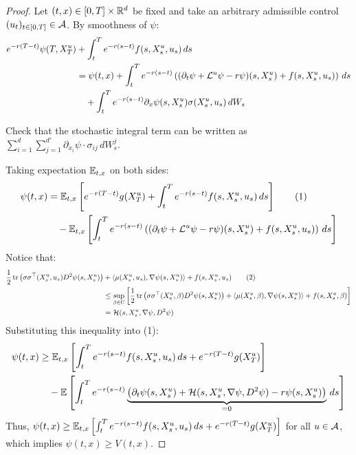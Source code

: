 \begin{remark}
    \begin{proof}
        Let $(t,x) \in [0,T] \times \mathbb R^d$ be fixed and take an arbitrary admissible control $(u_t)_{t \in [0,T]} \in \mathcal{A}$. By smoothness of $\psi$:
        \begin{align*}
            e^{-r(T-t)} \psi(T, X_T^u) &+ \int_t^T e^{-r(s-t)} f(s, X_s^u, u_s) \, ds \\
            &= \psi(t,x) + \int_t^T e^{-r(s-t)} \left((\partial_t \psi + \mathcal{L}^u \psi - r\psi)(s, X_s^u) + f(s, X_s^u, u_s)\right) \, ds \\
            &\quad + \int_t^T e^{-r(s-t)} \partial_x \psi(s, X_s^u) \sigma(X_s^u, u_s) \, dW_s
        \end{align*}
        
        \begin{homework}
            Check that the stochastic integral term can be written as $\sum_{i=1}^d \sum_{j=1}^{d'} \partial_{x_i} \psi \cdot \sigma_{ij} \, dW_s^j$.
        \end{homework}

        Taking expectation $\mathbb E_{t,x}$ on both sides:
        \begin{align*}
            \psi(t,x) &= \mathbb E_{t,x} \left[ e^{-r(T-t)} g(X_T^u) + \int_t^T e^{-r(s-t)} f(s, X_s^u, u_s) \, ds \right] \tag{1} \\
            &\quad - \mathbb E_{t,x} \left[ \int_t^T e^{-r(s-t)} \left((\partial_t \psi + \mathcal{L}^u \psi - r\psi)(s, X_s^u) + f(s, X_s^u, u_s)\right) \, ds \right]
        \end{align*}
        Notice that:
        \begin{align*}
            \frac{1}{2} \operatorname{tr} \left(\sigma \sigma^\top(X_s^u, u_s) D^2 \psi(s, X_s^u)\right) &+ \langle \mu(X_s^u, u_s), \nabla \psi(s, X_s^u) \rangle + f(s, X_s^u, u_s) \tag{2} \\
            &\leq \sup_{\beta \in U} \left[ \frac{1}{2} \operatorname{tr} \left(\sigma \sigma^\top(X_s^u, \beta) D^2 \psi(s, X_s^u)\right) + \langle \mu(X_s^u, \beta), \nabla \psi(s, X_s^u) \rangle + f(s, X_s^u, \beta) \right] \\
            &= \mathcal{H}(s, X_s^u, \nabla \psi, D^2 \psi)
        \end{align*}
        Substituting this inequality into (1):
        \begin{align*}
            \psi(t,x) &\geq \mathbb E_{t,x} \left[ \int_t^T e^{-r(s-t)} f(s, X_s^u, u_s) \, ds + e^{-r(T-t)} g(X_T^u) \right] \\
            &\quad - \mathbb E \left[ \int_t^T e^{-r(s-t)} \underbrace{\left(\partial_t \psi(s, X_s^u) + \mathcal{H}(s, X_s^u, \nabla \psi, D^2 \psi) - r\psi(s, X_s^u)\right)}_{=0} \, ds \right]
        \end{align*}
        Thus, $\psi(t,x) \geq \mathbb E_{t,x} \left[ \int_t^T e^{-r(s-t)} f(s, X_s^u, u_s) \, ds + e^{-r(T-t)} g(X_T^u) \right]$ for all $u \in \mathcal{A}$, which implies $\psi(t,x) \geq V(t,x)$.
        

\end{proof}
\end{remark}
